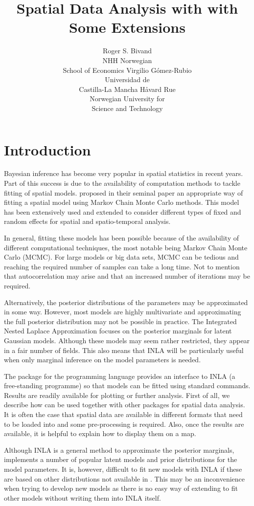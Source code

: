 \documentclass[article]{jss}
\author{Roger S. Bivand\\NHH Norwegian\\ School of Economics \And 
Virgilio G\'omez-Rubio\\Universidad de\\ Castilla-La Mancha 
\And H\r{a}vard Rue\\Norwegian University for\\ Science and Technology
}
\title{Spatial Data Analysis with \pkg{R-INLA} with Some Extensions}
\begin{document}
\section[Introduction]{Introduction}


Bayesian inference has become very popular in spatial statistics in recent
years. Part of this success is due to the availability of computation methods
to tackle fitting of spatial models. \citet{besagetal:1991} proposed in their
seminal paper an appropriate way of fitting a spatial model using Markov Chain
Monte Carlo methods. This model has been extensively used and extended to
consider different types of fixed and random effects for spatial and
spatio-temporal analysis.

In general, fitting these models has been possible because of the availability
of different computational techniques, the most notable being Markov Chain
Monte Carlo (MCMC). For large models or big data sets, MCMC can be tedious and
reaching the required number of samples can take a long time. Not to mention
that autocorrelation may arise and that an increased number of iterations may
be required.

Alternatively, the posterior distributions of the parameters may be
approximated in some way. However, most models are highly multivariate and
approximating the full posterior distribution may not be possible in practice.
The Integrated Nested Laplace Approximation \citep[][INLA]{isi:000264374200002}
focuses on the posterior marginals for latent Gaussian models. Although these
models may seem rather restricted, they appear in a fair number of fields.
This also means that INLA will be particularly useful when only marginal
inference on the model parameters is needed.

The  package \citep{rinla:2013} for the  programming
language provides an interface to INLA (a free-standing programme) so that models can be fitted using
standard  commands. Results are readily available for plotting or
further analysis. First of all, we describe how  can be used
together with other  packages for spatial data analysis. It is often
the case that spatial data are available in different formats
that need to be loaded into  and some pre-processing is
required. Also, once the results are available, it is helpful to explain 
how to display them on a map.

Although INLA is a general method to approximate the
posterior marginals,  implements a number of popular latent models and prior
distributions for the model parameters.
It is, however, difficult to fit new models with INLA if these
are based on other distributions not available in .  This may be an
inconvenience when trying to develop new models as there is no easy way of
extending  to fit other models without writing them into INLA itself.
\end{document}
